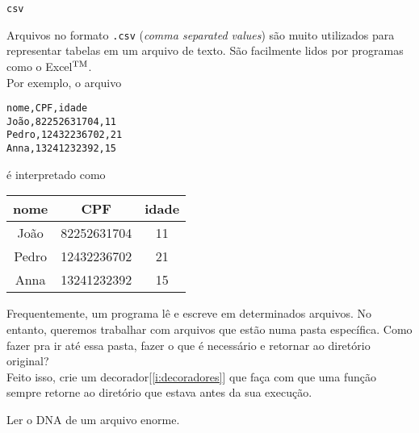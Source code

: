 \documentclass[12pt]{article}
\begin{document}
	\begin{interlude}{\texttt{csv}}
	
	Arquivos no formato \texttt{.csv} (\textit{comma separated values}) são muito utilizados para representar tabelas em um arquivo de texto. São facilmente lidos por programas como o Excel$^{\tiny \text{TM}}$.\\
	
	Por exemplo, o arquivo
	
	\begin{lstlisting}
nome,CPF,idade
João,82252631704,11
Pedro,12432236702,21
Anna,13241232392,15
	\end{lstlisting}
	
	é interpretado como
	
	\begin{center}
	\begin{tabular}{|c|c|c|}
	\hline
	nome  & CPF         & idade\\
	\hline 
	João  & 82252631704 &11\\
	\hline
	Pedro & 12432236702 &21\\
	\hline
	Anna  & 13241232392 &15\\
	\hline
	\end{tabular}
	\end{center}
	
	\end{interlude}
	
	
	Frequentemente, um programa lê e escreve em determinados arquivos. No entanto, queremos trabalhar com arquivos que estão numa pasta específica. Como fazer pra ir até essa pasta, fazer o que é necessário e retornar ao diretório original?\\
	
	\quest Feito isso, crie um decorador[\ref{i:decoradores}] que faça com que uma função sempre retorne ao diretório que estava antes da sua execução.
	
	\label{p:dna2}
	
	Ler o DNA de um arquivo enorme.
\end{document}
